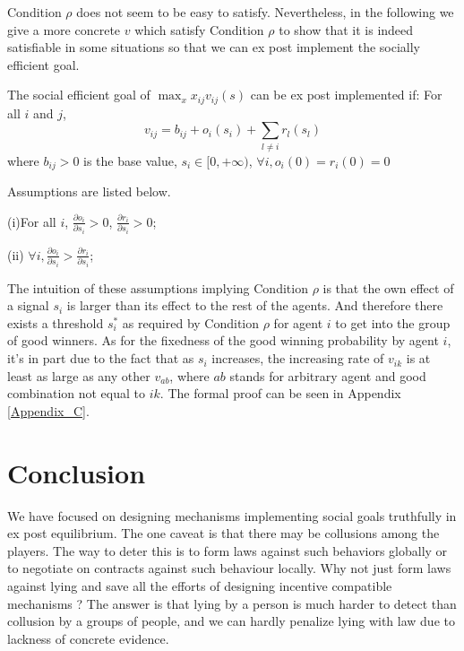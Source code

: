 Condition $\rho$ does not seem to be easy to satisfy. Nevertheless, in
the following we give a more concrete $v$ which satisfy Condition
$\rho$ to show that it is indeed satisfiable in some situations so
that we can ex post implement the socially efficient goal.
\begin{prop}
  \label{rho}
  The social efficient goal of $\max_{x}x_{ij}v_{ij}(s)$ can be ex post implemented if:
For all $i$ and $j$,
$$v_{ij}=b_{ij} + o_i(s_i) + \sum_{l \not = i} r_l(s_l) $$
where $b_{ij}>0$ is the base value, $s_i \in [0, + \infty)$, $\forall i,o_i(0)=r_i(0)=0$

Assumptions are listed below.

(i)For all $i$, $\frac{\partial o_i}{\partial s_i} > 0$, $\frac{\partial r_i}{\partial s_i} > 0$;

(ii) $\forall i, \frac{\partial o_i}{\partial s_i}
> \frac{\partial r_i}{\partial s_i}$;

\end{prop}


The intuition of these assumptions implying Condition $\rho$ is that
the own effect of a signal $s_i$ is larger than its effect to the rest
of the agents. And therefore there exists a threshold $s_i^*$ as
required by Condition $\rho$ for agent $i$ to get into the group of
good winners. As for the fixedness of the good winning probability by agent $i$,
it's in part due to the fact that as $s_i$ increases, the increasing
rate of $v_{ik}$ is at least as large as any other $v_{ab}$, where
$ab$ stands for arbitrary agent and good combination not equal to
$ik$. The formal proof can be seen in Appendix \ref{Appendix_C}.







\section{Conclusion}

We have focused on designing mechanisms implementing social goals truthfully in ex post equilibrium. The one caveat is that there may be collusions among the players. The way to deter this is to form laws against such behaviors globally or to negotiate on contracts against such behaviour locally. Why not just form laws against lying and save all the efforts of designing incentive compatible mechanisms ? The answer is that lying by a person is much harder to detect than collusion by a groups of people, and we can hardly penalize lying with law due to lackness of concrete evidence.

